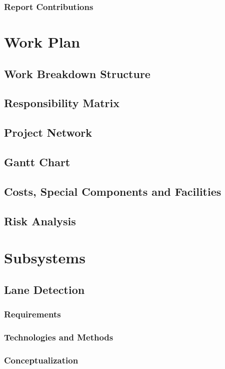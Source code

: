 \documentclass[titlepage]{article}
\begin{document}
\subsubsection{Report Contributions}

\section{Work Plan}
\subsection{Work Breakdown Structure}
\subsection{Responsibility Matrix}
\subsection{Project Network}
\subsection{Gantt Chart}
\subsection{Costs, Special Components and Facilities}
\subsection{Risk Analysis}

\section{Subsystems}

\subsection{Lane Detection}

\subsubsection{Requirements}
\subsubsection{Technologies and Methods}
\subsubsection{Conceptualization}
\end{document}
